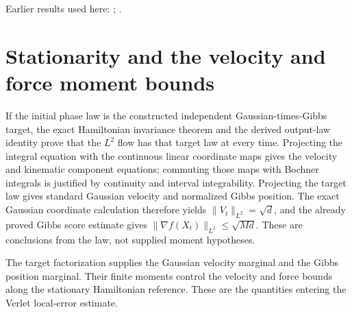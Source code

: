 \documentclass[11pt,a4paper]{article}
\begin{document}
Earlier results used here: \cite[Section~3.13.2]{LangevinLean2026ULASC}; \cite[Section~3.13.5]{LangevinLean2026ULASC}.

\section{\texorpdfstring{Stationarity and the velocity and force moment bounds}{Stationarity and the velocity and force moment bounds}}


If the initial phase law is the constructed independent Gaussian-times-Gibbs target, the exact Hamiltonian invariance theorem and the derived output-law identity prove that the \(L^{2}\) flow has that target law at every time. Projecting the integral equation with the continuous linear coordinate maps gives the velocity and kinematic component equations; commuting those maps with Bochner integrals is justified by continuity and interval integrability. Projecting the target law gives standard Gaussian velocity and normalized Gibbs position. The exact Gaussian coordinate calculation therefore yields \(\|V_t\|_{L^2}=\sqrt d\), and the already proved Gibbs score estimate gives \(\|\nabla f(X_t)\|_{L^2}\le\sqrt{Md}\). These are conclusions from the law, not supplied moment hypotheses.



The target factorization supplies the Gaussian velocity marginal and the Gibbs position marginal. Their finite moments control the velocity and force bounds along the stationary Hamiltonian reference. These are the quantities entering the Verlet local-error estimate.
\end{document}
